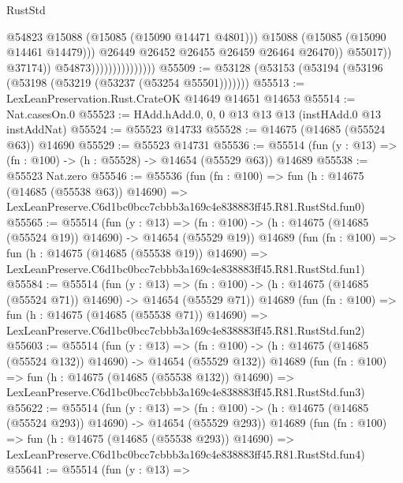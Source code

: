 \begin{lexlean}{RustStd}
\begin{coremodule}
                                                  @54823
                                                  @15088
                                                  (@15085 (@15090 @14471 @4801)))
                                                @15088
                                                (@15085 (@15090 @14461 @14479)))
                                              @26449
                                              @26452
                                              @26455
                                              @26459
                                              @26464
                                              @26470))
                                          @55017))
                                      @37174))
                                  @54873)))))))))))))))
@55509 := @53128 (@53153 (@53194 (@53196 (@53198 (@53219 (@53237 (@53254 @55501)))))))
@55513 := LexLeanPreservation.Rust.CrateOK @14649 @14651 @14653
@55514 := Nat.casesOn.{0}
@55523 := HAdd.hAdd.{0, 0, 0} @13 @13 @13 (instHAdd.{0} @13 instAddNat)
@55524 := @55523 @14733
@55528 := @14675 (@14685 (@55524 @63)) @14690
@55529 := @55523 @14731
@55536 := @55514 (fun (y : @13) => (fn : @100) -> (h : @55528) -> @14654 (@55529 @63)) @14689
@55538 := @55523 Nat.zero
@55546 := @55536
    (fun (fn : @100) =>
    fun (h : @14675 (@14685 (@55538 @63)) @14690) =>
    LexLeanPreserve.C6d1bc0bcc7cbbb3a169c4e838883ff45.R81.RustStd.fun0)
@55565 := @55514
    (fun (y : @13) =>
    (fn : @100) -> (h : @14675 (@14685 (@55524 @19)) @14690) -> @14654 (@55529 @19))
    @14689
    (fun (fn : @100) =>
    fun (h : @14675 (@14685 (@55538 @19)) @14690) =>
    LexLeanPreserve.C6d1bc0bcc7cbbb3a169c4e838883ff45.R81.RustStd.fun1)
@55584 := @55514
    (fun (y : @13) =>
    (fn : @100) -> (h : @14675 (@14685 (@55524 @71)) @14690) -> @14654 (@55529 @71))
    @14689
    (fun (fn : @100) =>
    fun (h : @14675 (@14685 (@55538 @71)) @14690) =>
    LexLeanPreserve.C6d1bc0bcc7cbbb3a169c4e838883ff45.R81.RustStd.fun2)
@55603 := @55514
    (fun (y : @13) =>
    (fn : @100) -> (h : @14675 (@14685 (@55524 @132)) @14690) -> @14654 (@55529 @132))
    @14689
    (fun (fn : @100) =>
    fun (h : @14675 (@14685 (@55538 @132)) @14690) =>
    LexLeanPreserve.C6d1bc0bcc7cbbb3a169c4e838883ff45.R81.RustStd.fun3)
@55622 := @55514
    (fun (y : @13) =>
    (fn : @100) -> (h : @14675 (@14685 (@55524 @293)) @14690) -> @14654 (@55529 @293))
    @14689
    (fun (fn : @100) =>
    fun (h : @14675 (@14685 (@55538 @293)) @14690) =>
    LexLeanPreserve.C6d1bc0bcc7cbbb3a169c4e838883ff45.R81.RustStd.fun4)
@55641 := @55514
    (fun (y : @13) =>

\end{coremodule}
\end{lexlean}
